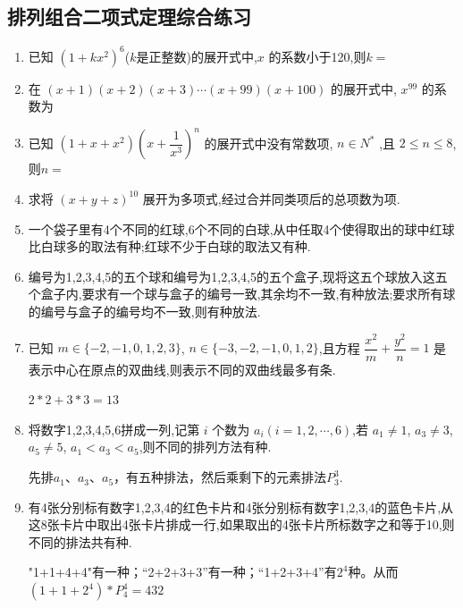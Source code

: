\subsection*{排列组合二项式定理综合练习}
\begin{enumerate}


\item 已知 $(1+kx^{2})^{6}$($k$是正整数)的展开式中,$x$ 的系数小于120,则$k=$


\item 在 $(x+1)(x+2)(x+3)\cdots(x+99)(x+100)$ 的展开式中, $x^{99}$ 的系数为

\item 已知 $(1+x+x^{2})(x+\dfrac{1}{x^{3}})^{n}$ 的展开式中没有常数项, $n\in N^{*}$ ,且 $2\le n\le8$,则$n=$

\item 求将 $(x+y+z)^{10}$ 展开为多项式,经过合并同类项后的总项数为项.

\item 一个袋子里有4个不同的红球,6个不同的白球,从中任取4个使得取出的球中红球比白球多的取法有种;红球不少于白球的取法又有种.

\item 编号为1,2,3,4,5的五个球和编号为1,2,3,4,5的五个盒子,现将这五个球放入这五个盒子内,要求有一个球与盒子的编号一致,其余均不一致,有种放法;要求所有球的编号与盒子的编号均不一致,则有种放法.

\item 已知 $m\in\{-2,-1,0,1,2,3\}$, $n\in\{-3,-2,-1,0,1,2\}$,且方程 $\dfrac{x^{2}}{m}+\dfrac{y^{2}}{n}=1$ 是表示中心在原点的双曲线,则表示不同的双曲线最多有条.
\begin{jieda}
    $2*2+3*3=13$
\end{jieda}

\item 将数字1,2,3,4,5,6拼成一列,记第 $i$ 个数为 $a_{i}(i=1,2,\cdots,6)$,若 $a_{1}\ne1$, $a_{3}\ne3$, $a_{5}\ne5$, $a_{1}<a_{3}<a_{5}$,则不同的排列方法有种.
\begin{jieda}
    先排$a_1、a_3、a_5$，有五种排法，然后乘剩下的元素排法$P^3_3$.
\end{jieda}

\item 有4张分别标有数字1,2,3,4的红色卡片和4张分别标有数字1,2,3,4的蓝色卡片,从这8张卡片中取出4张卡片排成一行,如果取出的4张卡片所标数字之和等于10,则不同的排法共有种.
\begin{jieda}
    "1+1+4+4"有一种；“2+2+3+3”有一种；“1+2+3+4”有$2^4$种。从而$(1+1+2^4)*P^4_4=432$
\end{jieda}


\end{enumerate}
